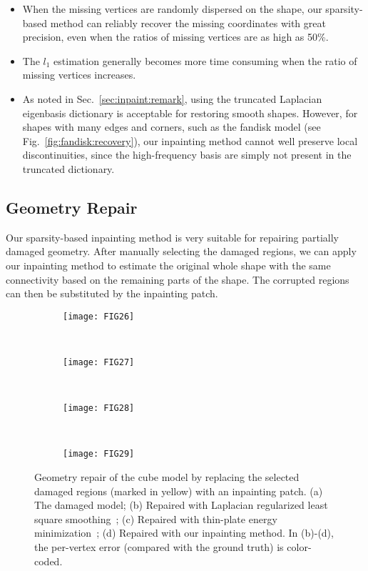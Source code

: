 \begin{itemize}
  \item When the missing vertices are randomly dispersed on the shape, our
        sparsity-based method can reliably recover the missing coordinates
        with great precision, even when the ratios of missing vertices are
        as high as 50\%.
  \item The $l_1$ estimation generally becomes more time consuming when the
        ratio of missing vertices increases.
  \item As noted in Sec.~\ref{sec:inpaint:remark}, using the truncated Laplacian
        eigenbasis dictionary is acceptable for restoring smooth shapes.
        However, for shapes with many edges and corners, such as the fandisk
        model (see Fig.~\ref{fig:fandisk:recovery}), our inpainting method
        cannot well preserve local discontinuities, since the high-frequency
        basis are simply not present in the truncated dictionary.
\end{itemize}

\subsection{Geometry Repair}
Our sparsity-based inpainting method is very suitable for repairing partially
damaged geometry. After manually selecting the damaged regions, we can apply
our inpainting method to estimate the original whole shape with the same
connectivity based on the remaining parts of the shape. The corrupted regions
can then be substituted by the inpainting patch.

\begin{figure}
    \centering
    \begin{subfigure}[b]{0.23\linewidth}
        \texttt{[image: FIG26]}
        \caption{}
    \end{subfigure}%
    ~
    \begin{subfigure}[b]{0.23\linewidth}
        \texttt{[image: FIG27]}
        \caption{}
    \end{subfigure}
    ~
    \begin{subfigure}[b]{0.23\linewidth}
        \texttt{[image: FIG28]}
        \caption{}
    \end{subfigure}
    ~
    \begin{subfigure}[b]{0.23\linewidth}
        \texttt{[image: FIG29]}
        \caption{}
    \end{subfigure}
\caption[Geometry repair of the damaged cube model.]
        {Geometry repair of the cube model by replacing the selected damaged regions (marked in yellow) with an inpainting patch.
         (a) The damaged model; (b) Repaired with Laplacian regularized least square smoothing~\cite{Nealen2006};
         (c) Repaired with thin-plate energy minimization~\cite{Bac2008};
         (d) Repaired with our inpainting method. In (b)-(d), the per-vertex error (compared with the ground truth) is color-coded.}
\label{fig:repair:cube}
\end{figure}

